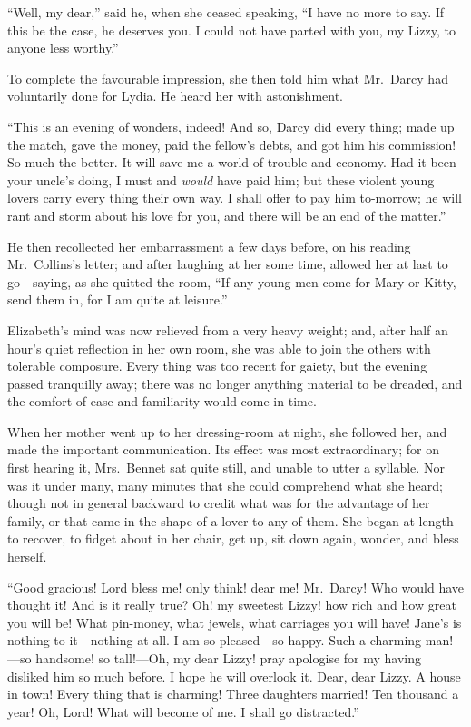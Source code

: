 ``Well, my dear,'' said he, when she ceased speaking, ``I have no
more to say.  If this be the case, he deserves you.  I could
not have parted with you, my Lizzy, to anyone less worthy.''

To complete the favourable impression, she then told him what
Mr.\ Darcy had voluntarily done for Lydia.  He heard her with
astonishment.

``This is an evening of wonders, indeed!  And so, Darcy did
every thing; made up the match, gave the money, paid the
fellow's debts, and got him his commission!  So much the
better.  It will save me a world of trouble and economy.
Had it been your uncle's doing, I must and \emph{would} have paid
him; but these violent young lovers carry every thing their
own way.  I shall offer to pay him to-morrow; he will rant
and storm about his love for you, and there will be an end
of the matter.''

He then recollected her embarrassment a few days before, on his
reading Mr.\ Collins's letter; and after laughing at her some
time, allowed her at last to go---saying, as she quitted the
room, ``If any young men come for Mary or Kitty, send them in,
for I am quite at leisure.''

Elizabeth's mind was now relieved from a very heavy weight;
and, after half an hour's quiet reflection in her own room,
she was able to join the others with tolerable composure.
Every thing was too recent for gaiety, but the evening passed
tranquilly away; there was no longer anything material to
be dreaded, and the comfort of ease and familiarity would
come in time.

When her mother went up to her dressing-room at night, she
followed her, and made the important communication.  Its effect
was most extraordinary; for on first hearing it, Mrs.\ Bennet
sat quite still, and unable to utter a syllable.  Nor was it
under many, many minutes that she could comprehend what she
heard; though not in general backward to credit what was for
the advantage of her family, or that came in the shape of a
lover to any of them.  She began at length to recover, to
fidget about in her chair, get up, sit down again, wonder,
and bless herself.

``Good gracious!  Lord bless me!  only think!  dear me!
Mr.\ Darcy!  Who would have thought it!  And is it really true?
Oh! my sweetest Lizzy! how rich and how great you will be!
What pin-money, what jewels, what carriages you will have!
Jane's is nothing to it---nothing at all.  I am so pleased---so
happy.  Such a charming man!---so handsome! so tall!---Oh, my
dear Lizzy! pray apologise for my having disliked him so much
before.  I hope he will overlook it.  Dear, dear Lizzy.  A house
in town!  Every thing that is charming!  Three daughters
married!  Ten thousand a year!  Oh, Lord!  What will become of
me.  I shall go distracted.''

